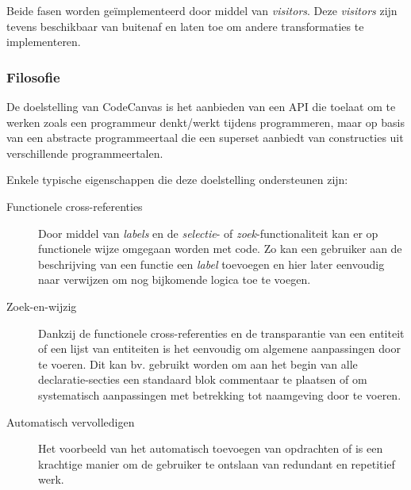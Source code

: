 Beide fasen worden ge\"implementeerd door middel van \emph{visitors}. Deze
\emph{visitors} zijn tevens beschikbaar van buitenaf en laten toe om andere
transformaties te implementeren.

\subsubsection{Filosofie}

De doelstelling van CodeCanvas is het aanbieden van een API die toelaat om te
werken zoals een programmeur denkt/werkt tijdens programmeren, maar op basis
van een abstracte programmeertaal die een superset aanbiedt van constructies
uit verschillende programmeertalen.

Enkele typische eigenschappen die deze doelstelling ondersteunen zijn:

\begin{description}

  \item[Functionele cross-referenties] Door middel van \emph{labels} en de
  \emph{selectie}- of \emph{zoek}-functionaliteit kan er op functionele wijze
  omgegaan worden met code. Zo kan een gebruiker aan de beschrijving van een
  functie een \emph{label} toevoegen en hier later eenvoudig naar verwijzen om
  nog bijkomende logica toe te voegen.

  \item[Zoek-en-wijzig] Dankzij de functionele cross-referenties en de
  transparantie van een entiteit of een lijst van entiteiten is het eenvoudig
  om algemene aanpassingen door te voeren. Dit kan bv. gebruikt worden om aan
  het begin van alle declaratie-secties een standaard blok commentaar te
  plaatsen of om systematisch aanpassingen met betrekking tot naamgeving door
  te voeren.

  \item[Automatisch vervolledigen] Het voorbeeld van het automatisch toevoegen
  van  opdrachten of  is een krachtige manier om de
  gebruiker te ontslaan van redundant en repetitief werk.

\end{description}
